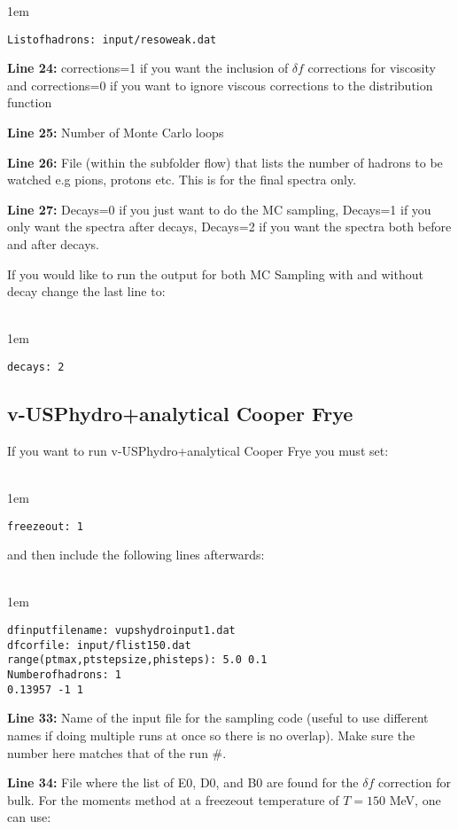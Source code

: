 \documentclass[article]{revtex4-1}
\newcommand{\code}[1]{\bigskip\noindent\begin{addmargin}[3em]{1em}\begin{linenumbers}\texttt{#1}\end{linenumbers}\end{addmargin}\bigskip}
\begin{document}
\code{List\textunderscore of\textunderscore hadrons: input/resoweak.dat }

{\bf Line 24:} corrections=1 if you want the inclusion of $\delta f$ corrections for viscosity and corrections=0 if you want to ignore viscous corrections to the distribution function

{\bf Line 25:} Number of Monte Carlo loops

{\bf Line 26:} File (within the subfolder flow) that lists the number of hadrons to be watched e.g pions, protons etc.  This is for the final spectra only.

{\bf Line 27:} Decays=0 if you just want to do the MC sampling, Decays=1 if you only want the spectra after decays, Decays=2 if you want the spectra both before and after decays. 

If you would like to run the output for both MC Sampling with and without decay change the last line to: \\~\\

\code{decays: 2}

\subsection{v-USPhydro+analytical Cooper Frye}\label{sec:frz1}

If you want to run v-USPhydro+analytical Cooper Frye you must set:\\ ~\\

\code{freezeout: 1} 
and then include the following lines afterwards: \\  ~\\

\code{dfinputfilename: vupshydroinput1.dat \\
df\textunderscore cor\textunderscore file: input/flist150.dat \\
range(ptmax,ptstepsize,phisteps): 5.0 0.1 \\
Number\textunderscore of\textunderscore hadrons: 1   \\
0.13957 -1 1} 

{\bf Line 33:} Name of the input file for the sampling code (useful to use different names if doing multiple runs at once so there is no overlap).  Make sure the number here matches that of the run $\#$. 


{\bf Line 34:} File where the list of E0, D0, and B0 are found for the $\delta f$ correction for bulk.  For the moments method at a freezeout temperature of $T=150$ MeV, one can use:
\end{document}
